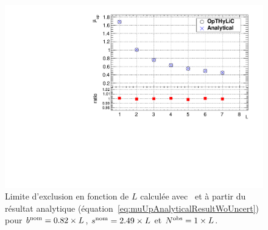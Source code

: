 \begin{figure}[!htb]
\begin{center}
\includegraphics[scale=0.5]{figures/SingleChannelNoUncertainties.pdf}
\caption{Limite d'exclusion en fonction de $L$ calcul\'ee avec \opthylic~et \`a partir du r\'esultat analytique (\'equation~\ref{eq:muUpAnalyticalResultWoUncert}) pour $b^{\text{nom}}=0.82\times L$, $s^{\text{nom}}=2.49\times L$ et $N^{\text{obs}}=1\times L$.\label{fig:ExampleValidNoUncertVsAnalytical}}
\end{center}
\end{figure}


